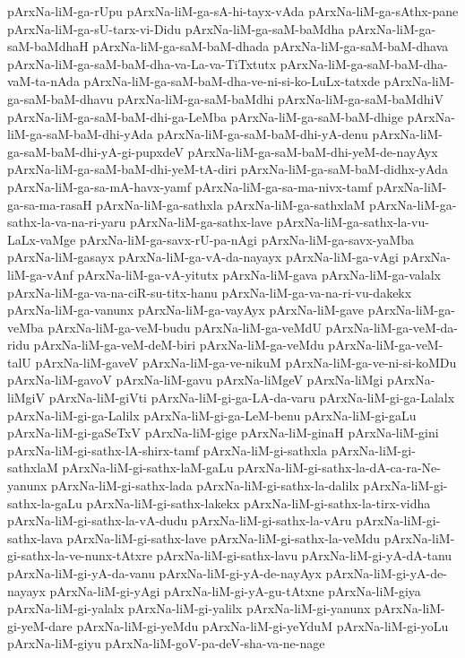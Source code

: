 {pArxNa-liM-ga-rUpu
pArxNa-liM-ga-sA-hi-tayx-vAda
pArxNa-liM-ga-sAthx-pane
pArxNa-liM-ga-sU-tarx-vi-Didu
pArxNa-liM-ga-saM-baMdha
pArxNa-liM-ga-saM-baMdhaH
pArxNa-liM-ga-saM-baM-dhada
pArxNa-liM-ga-saM-baM-dhava
pArxNa-liM-ga-saM-baM-dha-va-La-va-TiTxtutx
pArxNa-liM-ga-saM-baM-dha-vaM-ta-nAda
pArxNa-liM-ga-saM-baM-dha-ve-ni-si-ko-LuLx-tatxde
pArxNa-liM-ga-saM-baM-dhavu
pArxNa-liM-ga-saM-baMdhi
pArxNa-liM-ga-saM-baMdhiV
pArxNa-liM-ga-saM-baM-dhi-ga-LeMba
pArxNa-liM-ga-saM-baM-dhige
pArxNa-liM-ga-saM-baM-dhi-yAda
pArxNa-liM-ga-saM-baM-dhi-yA-denu
pArxNa-liM-ga-saM-baM-dhi-yA-gi-pupxdeV
pArxNa-liM-ga-saM-baM-dhi-yeM-de-nayAyx
pArxNa-liM-ga-saM-baM-dhi-yeM-tA-diri
pArxNa-liM-ga-saM-baM-didhx-yAda
pArxNa-liM-ga-sa-mA-havx-yamf
pArxNa-liM-ga-sa-ma-nivx-tamf
pArxNa-liM-ga-sa-ma-rasaH
pArxNa-liM-ga-sathxla
pArxNa-liM-ga-sathxlaM
pArxNa-liM-ga-sathx-la-va-na-ri-yaru
pArxNa-liM-ga-sathx-lave
pArxNa-liM-ga-sathx-la-vu-LaLx-vaMge
pArxNa-liM-ga-savx-rU-pa-nAgi
pArxNa-liM-ga-savx-yaMba
pArxNa-liM-gasayx
pArxNa-liM-ga-vA-da-nayayx
pArxNa-liM-ga-vAgi
pArxNa-liM-ga-vAnf
pArxNa-liM-ga-vA-yitutx
pArxNa-liM-gava
pArxNa-liM-ga-valalx
pArxNa-liM-ga-va-na-ciR-su-titx-hanu
pArxNa-liM-ga-va-na-ri-vu-dakekx
pArxNa-liM-ga-vanunx
pArxNa-liM-ga-vayAyx
pArxNa-liM-gave
pArxNa-liM-ga-veMba
pArxNa-liM-ga-veM-budu
pArxNa-liM-ga-veMdU
pArxNa-liM-ga-veM-da-ridu
pArxNa-liM-ga-veM-deM-biri
pArxNa-liM-ga-veMdu
pArxNa-liM-ga-veM-talU
pArxNa-liM-gaveV
pArxNa-liM-ga-ve-nikuM
pArxNa-liM-ga-ve-ni-si-koMDu
pArxNa-liM-gavoV
pArxNa-liM-gavu
pArxNa-liMgeV
pArxNa-liMgi
pArxNa-liMgiV
pArxNa-liM-giVti
pArxNa-liM-gi-ga-LA-da-varu
pArxNa-liM-gi-ga-Lalalx
pArxNa-liM-gi-ga-Lalilx
pArxNa-liM-gi-ga-LeM-benu
pArxNa-liM-gi-gaLu
pArxNa-liM-gi-gaSeTxV
pArxNa-liM-gige
pArxNa-liM-ginaH
pArxNa-liM-gini
pArxNa-liM-gi-sathx-lA-shirx-tamf
pArxNa-liM-gi-sathxla
pArxNa-liM-gi-sathxlaM
pArxNa-liM-gi-sathx-laM-gaLu
pArxNa-liM-gi-sathx-la-dA-ca-ra-Ne-yanunx
pArxNa-liM-gi-sathx-lada
pArxNa-liM-gi-sathx-la-dalilx
pArxNa-liM-gi-sathx-la-gaLu
pArxNa-liM-gi-sathx-lakekx
pArxNa-liM-gi-sathx-la-tirx-vidha
pArxNa-liM-gi-sathx-la-vA-dudu
pArxNa-liM-gi-sathx-la-vAru
pArxNa-liM-gi-sathx-lava
pArxNa-liM-gi-sathx-lave
pArxNa-liM-gi-sathx-la-veMdu
pArxNa-liM-gi-sathx-la-ve-nunx-tAtxre
pArxNa-liM-gi-sathx-lavu
pArxNa-liM-gi-yA-dA-tanu
pArxNa-liM-gi-yA-da-vanu
pArxNa-liM-gi-yA-de-nayAyx
pArxNa-liM-gi-yA-de-nayayx
pArxNa-liM-gi-yAgi
pArxNa-liM-gi-yA-gu-tAtxne
pArxNa-liM-giya
pArxNa-liM-gi-yalalx
pArxNa-liM-gi-yalilx
pArxNa-liM-gi-yanunx
pArxNa-liM-gi-yeM-dare
pArxNa-liM-gi-yeMdu
pArxNa-liM-gi-yeYduM
pArxNa-liM-gi-yoLu
pArxNa-liM-giyu
pArxNa-liM-goV-pa-deV-sha-va-ne-nage
}
